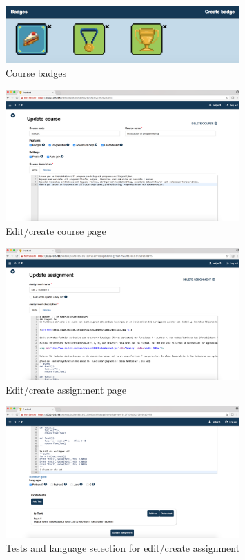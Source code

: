 \begin{figure}[H]
\centering
\includegraphics[width=0.8\textwidth]{img/gppinpictures/badges.png}
\caption{Course badges}
\label{fig:login}
\end{figure}

\begin{figure}[H]
\centering
\includegraphics[width=0.8\textwidth]{img/gppinpictures/editcourse.png}
\caption{Edit/create course page}
\label{fig:editcourse}
\end{figure}

\begin{figure}[H]
\centering
\includegraphics[width=0.8\textwidth]{img/gppinpictures/editassignment.png}
\caption{Edit/create assignment page}
\label{fig:editassignment}
\end{figure}

\begin{figure}[H]
\centering
\includegraphics[width=0.8\textwidth]{img/gppinpictures/editassignmenttests.png}
\caption{Tests and language selection for edit/create assignment}
\label{fig:editassignment2}
\end{figure}

